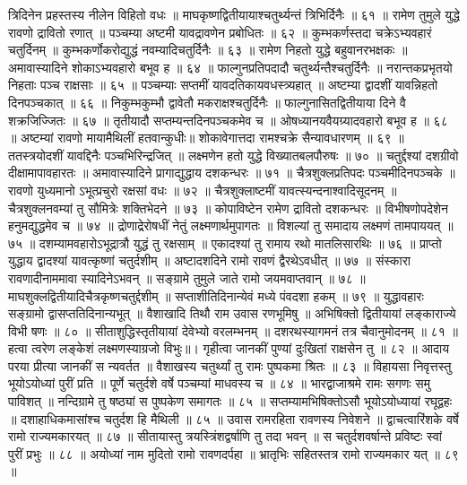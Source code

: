 त्रिदिनेन प्रहस्तस्य नीलेन विहितो वधः ॥
माघकृष्णद्वितीयायाश्चतुर्थ्यन्तं त्रिभिर्दिनैः ॥ ६१ ॥
रामेण तुमुले युद्धे रावणो द्रावितो रणात् ॥
पञ्चम्या अष्टमी यावद्रावणेन प्रबोधितः ॥ ६२ ॥
कुम्भकर्णस्तदा चक्रेऽभ्यवहारं चतुर्दिनम् ॥
कुम्भकर्णोकरोद्युद्धं नवम्यादिचतुर्दिनैः ॥ ६३ ॥
रामेण निहतो युद्धे बहुवानरभक्षकः ॥
अमावास्यादिने शोकाऽभ्यवहारो बभूव ह ॥ ६४ ॥
फाल्गुनप्रतिपदादौ चतुर्थ्यन्तैश्चतुर्दिनैः ॥
नरान्तकप्रभृतयो निहताः पञ्च राक्षसाः ॥ ६५ ॥
पञ्चम्याः सप्तमीं यावदतिकायवधस्त्र्यहात् ॥
अष्टम्या द्वादशीं यावन्निहतो दिनपञ्चकात् ॥ ६६ ॥
निकुम्भकुम्भौ द्वावेतौ मकराक्षश्चतुर्दिनैः ॥
फाल्गुनासितद्वितीयाया दिने वै शक्रजिज्जितः ॥ ६७ ॥
तृतीयादौ सप्तम्यन्तदिनपञ्चकमेव च ॥
ओषध्यानयवैयग्र्यादवहारो बभूव ह ॥ ६८ ॥
अष्टम्यां रावणो मायामैथिलीं हतवान्कुधीः॥
शोकावेगात्तदा रामश्चक्रे सैन्यावधारणम् ॥ ६९ ॥
ततस्त्रयोदशीं यावद्दिनैः पञ्चभिरिन्द्रजित् ॥
लक्ष्मणेन हतो युद्धे विख्यातबलपौरुषः ॥ ७० ॥
चतुर्द्दश्यां दशग्रीवो दीक्षामापावहारतः ॥
अमावास्यादिने प्रागाद्युद्धाय दशकन्धरः ॥ ७१ ॥
चैत्रशुक्लप्रतिपदः पञ्चमीदिनपञ्चके ॥
रावणो युध्यमानो ऽभूत्प्रचुरो रक्षसां वधः ॥ ७२ ॥
चैत्रशुक्लाष्टमीं यावत्स्यन्दनाश्वादिसूदनम् ॥
चैत्रशुक्लनवम्यां तु सौमित्रेः शक्तिभेदने ॥ ७३ ॥
कोपाविष्टेन रामेण द्रावितो दशकन्धरः ॥
विभीषणोपदेशेन हनुमद्युद्धमेव च ॥ ७४ ॥
द्रोणाद्रेरोषधीं नेतुं लक्ष्मणार्थमुपागतः ॥
विशल्यां तु समादाय लक्ष्मणं तामपाययत् ॥ ७५ ॥
दशम्यामवहारोऽभूद्रात्रौ युद्धं तु रक्षसाम् ॥
एकादश्यां तु रामाय रथो मातलिसारथिः ॥ ७६ ॥
प्राप्तो युद्धाय द्वादश्यां यावत्कृष्णां चतुर्दशीम् ॥
अष्टादशदिने रामो रावणं द्वैरथेऽवधीत् ॥ ७७ ॥
संस्कारा रावणादीनाममावा स्यादिनेऽभवन् ॥
सङ्ग्रामे तुमुले जाते रामो जयमवाप्तवान् ॥ ७८ ॥
माघशुक्लद्वितीयादिचैत्रकृष्णचतुर्द्दशीम् ॥
सप्ताशीतिदिनान्येवं मध्ये पंवदशा हकम् ॥ ७९ ॥
युद्धावहारः सङ्ग्रामो द्वासप्ततिदिनान्यभूत् ॥
वैशाखादि तिथौ राम उवास रणभूमिषु ॥
अभिषिक्तो द्वितीयायां लङ्काराज्ये विभी षणः ॥ ८० ॥
सीताशुद्धिस्तृतीयायां देवेभ्यो वरलम्भनम् ॥
दशरथस्यागमनं तत्र चैवानुमोदनम् ॥ ८१ ॥
हत्वा त्वरेण लङ्केशं लक्ष्मणस्याग्रजो विभुः॥।
गृहीत्वा जानकीं पुण्यां दुःखितां राक्षसेन तु ॥ ८२ ॥
आदाय परया प्रीत्या जानकीं स न्यवर्तत ॥
वैशाखस्य चतुर्थ्यां तु रामः पुष्पकमा श्रितः ॥ ८३ ॥
विहायसा निवृत्तस्तु भूयोऽयोध्यां पुरीं प्रति ॥
पूर्णे चतुर्दशे वर्षे पञ्चम्यां माधवस्य च ॥ ८४ ॥
भारद्वाजाश्रमे रामः सगणः समु पाविशत् ॥
नन्दिग्रामे तु षष्ठ्यां स पुष्पकेण समागतः ॥ ८५ ॥
सप्तम्यामभिषिक्तोऽसौ भूयोऽयोध्यायां रघूद्वहः ॥
दशाहाधिकमासांश्च चतुर्दश हि मैथिली ॥ ८५ ॥
उवास रामरहिता रावणस्य निवेशने ॥
द्वाचत्वारिंशके वर्षे रामो राज्यमकारयत् ॥ ८७ ॥
सीतायास्तु त्रयस्त्रिंशद्वर्षाणि तु तदा भवन् ॥
स चतुर्दशवर्षान्ते प्रविष्टः स्वां पुरीं प्रभुः ॥ ८८ ॥
अयोध्यां नाम मुदितो रामो रावणदर्पहा ॥
भ्रातृभिः सहितस्तत्र रामो राज्यमकार यत् ॥ ८९ ॥
